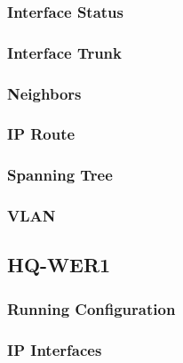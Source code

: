 \subsubsection{Interface Status}


\subsubsection{Interface Trunk}


\subsubsection{Neighbors}


\subsubsection{IP Route}


\subsubsection{Spanning Tree}


\subsubsection{VLAN}





\subsection{HQ-WER1}
\subsubsection{Running Configuration}


\subsubsection{IP Interfaces}


